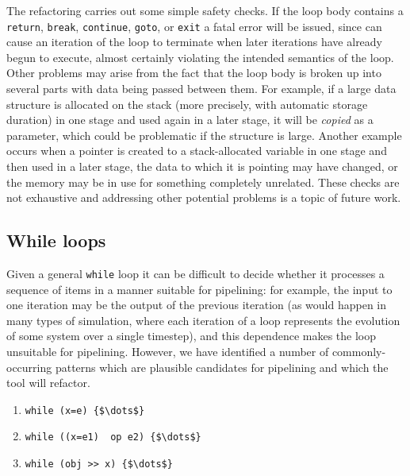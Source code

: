 The refactoring carries out some simple safety checks. If the loop
body contains a \texttt{return}, \texttt{break}, \texttt{continue},
\texttt{goto}, or \texttt{exit} a fatal error will be issued, since
can cause an iteration of the loop to terminate when later
iterations have already begun to execute, almost certainly violating the
intended semantics of the loop. Other problems may arise from the fact that the loop body is broken up
into several parts with data being passed between them. 
% 
  For example, if a large data structure is allocated on the stack (more precisely,
  with automatic storage duration) in one stage and used again in a
  later stage, it will be \emph{copied} as a parameter, which could be
  problematic if the structure is large.
  Another example occurs when a pointer is created to a stack-allocated variable in one stage and
  then used in a later stage, the data to which it is pointing may have
  changed, or the memory may be in use for something completely
  unrelated.
% 
These checks are not exhaustive and addressing other potential problems is a topic of future work.


\subsection{While loops}\label{while-loops}

Given a general \texttt{while} loop it can be
difficult to decide whether it processes a sequence of items in a manner
suitable for pipelining: for example, the input to one iteration may be
the output of the previous iteration (as would happen in many types of
simulation, where each iteration of a loop represents the evolution of
some system over a single timestep), and this dependence makes the loop
unsuitable for pipelining. However, we have identified a number of
commonly-occurring patterns which are plausible candidates for
pipelining and which the tool will refactor.
% 
\begin{enumerate}
\def\labelenumi{\arabic{enumi}.}
\item
  \lstinline[mathescape]|while (x=e) {$\dots$}|
\item
  \lstinline[mathescape]|while ((x=e1)  op e2) {$\dots$}|
\item
  \lstinline[mathescape]|while (obj >> x) {$\dots$}|
\end{enumerate}

